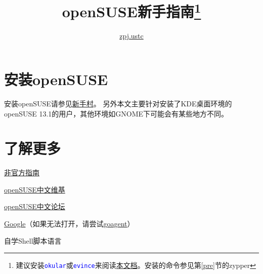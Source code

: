 \documentclass[11pt]{article}
\newcommand{\command}[1]{\texttt{\textcolor{blue}{#1}}}
\begin{document}
\title{openSUSE新手指南\thanks{建议安装\command{okular}或\command{evince}来阅读\href{https://jianguoyun.com/p/De3q8f4Q8-HjBRip_Qg}{本文档}。安装的命令参见第\ref{pre}节的zypper}}
\author{\href{mailto:zpj.ustc@gmail.com}{zpj.ustc}}
\date{}
\maketitle
\tableofcontents
\section{安装openSUSE}
安装openSUSE请参见\href{https://zh.opensuse.org/%E6%96%B0%E6%89%8B%E6%9D%91}{新手村}。
另外本文主要针对安装了KDE桌面环境的openSUSE 13.1的用户，其他环境如GNOME下可能会有某些地方不同。
\section{了解更多}
\begin{compactitem}
 \item \href{https://lug.ustc.edu.cn/sites/opensuse-guide/}{非官方指南}
 \item \href{https://zh.opensuse.org/%E9%A6%96%E9%A1%B5}{openSUSE中文维基}
 \item \href{https://forum.suse.org.cn/}{openSUSE中文论坛}
 \item \href{https://google.com}{Google}（如果无法打开，请尝试\href{https://code.google.com/p/goagent/}{goagent}）
 \item 自学Shell脚本语言
\end{compactitem}
\end{document}
